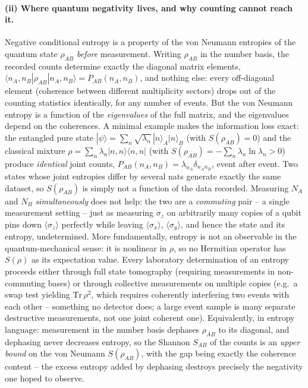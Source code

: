 \documentclass[11pt]{article}
\begin{document}
\paragraph{(ii) Where quantum negativity lives, and why counting cannot
reach it.} Negative conditional entropy is a property of the von Neumann
entropies of the quantum state $\rho_{AB}$ \emph{before} measurement.
Writing $\rho_{AB}$ in the number basis, the recorded counts determine
exactly the diagonal matrix elements,
$\langle n_A,n_B|\rho_{AB}|n_A,n_B\rangle = P_{AB}(n_A,n_B)$, and
nothing else: every off-diagonal element (coherence between different
multiplicity sectors) drops out of the counting statistics identically,
for any number of events. But the von Neumann entropy is a function of
the \emph{eigenvalues} of the full matrix, and the eigenvalues depend on
the coherences. A minimal example makes the information loss exact: the
entangled pure state
$|\psi\rangle=\sum_n\sqrt{\lambda_n}\,|n\rangle_A|n\rangle_B$ (with
$S(\rho_{AB})=0$) and the classical mixture
$\rho=\sum_n\lambda_n|n,n\rangle\langle n,n|$ (with
$S(\rho_{AB})=-\sum_n\lambda_n\ln\lambda_n>0$) produce \emph{identical}
joint counts, $P_{AB}(n_A,n_B)=\lambda_{n_A}\delta_{n_An_B}$, event
after event. Two states whose joint entropies differ by several nats
generate exactly the same dataset, so $S(\rho_{AB})$ is simply not a
function of the data recorded. Measuring $N_A$ and $N_B$
\emph{simultaneously} does not help: the two are a \emph{commuting}
pair -- a single measurement setting -- just as measuring $\sigma_z$ on
arbitrarily many copies of a qubit pins down
$\langle\sigma_z\rangle$ perfectly while leaving
$\langle\sigma_x\rangle$, $\langle\sigma_y\rangle$, and hence the state
and its entropy, undetermined. More fundamentally, entropy is not an
observable in the quantum-mechanical sense: it is nonlinear in $\rho$,
so no Hermitian operator has $S(\rho)$ as its expectation value. Every
laboratory determination of an entropy proceeds either through full
state tomography (requiring measurements in non-commuting bases) or
through collective measurements on multiple copies (e.g.\ a swap test
yielding $\mathrm{Tr}\,\rho^2$, which requires coherently interfering
two events with each other -- something no detector does; a large event
sample is many separate destructive measurements, not one joint coherent
one). Equivalently, in entropy language: measurement in the number basis
dephases $\rho_{AB}$ to its diagonal, and dephasing never decreases
entropy, so the Shannon $S_{AB}$ of the counts is an \emph{upper bound}
on the von Neumann $S(\rho_{AB})$, with the gap being exactly the
coherence content -- the excess entropy added by dephasing destroys
precisely the negativity one hoped to observe.
\end{document}
